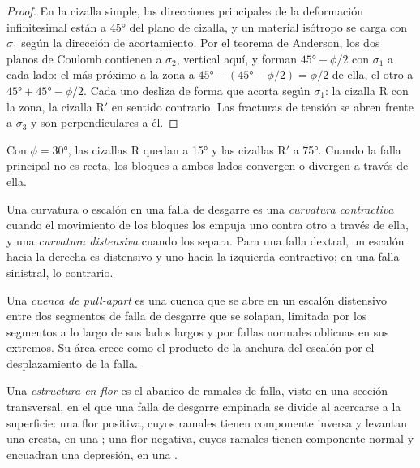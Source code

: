 \begin{proof}
En la cizalla simple, las direcciones principales de la deformación infinitesimal están a
\ang{45} del plano de cizalla, y un material isótropo se carga con
$\sigma_1$ según la dirección de acortamiento. Por el teorema de Anderson, los dos planos de Coulomb
contienen a $\sigma_2$, vertical aquí, y forman $\ang{45} - \phi/2$ con
$\sigma_1$ a cada lado: el más próximo a la zona a $\ang{45} -
(\ang{45} - \phi/2) = \phi/2$ de ella, el otro a $\ang{45} + \ang{45} -
\phi/2$. Cada uno desliza de forma que acorta según $\sigma_1$: la cizalla R con
la zona, la cizalla R$'$ en sentido contrario. Las fracturas de tensión se abren frente a $\sigma_3$ y
son perpendiculares a él.
\end{proof}

Con $\phi = \ang{30}$, las cizallas R quedan a \ang{15} y las cizallas R$'$ a
\ang{75}. Cuando la falla principal no es recta, los bloques a ambos lados
convergen o divergen a través de ella.

\begin{definition}\label{def:b3:extension-strike-slip:bends}
Una curvatura o escalón en una falla de desgarre es una \emph{curvatura
contractiva} cuando el movimiento de los bloques los empuja uno contra otro
a través de ella, y una \emph{curvatura distensiva} cuando los separa. Para una falla
dextral, un escalón hacia la derecha es distensivo y uno hacia la izquierda contractivo;
en una falla sinistral, lo contrario.
\end{definition}

\begin{definition}\label{def:b3:extension-strike-slip:pull-apart}
Una \emph{cuenca de pull-apart} es una cuenca que se abre en
un escalón distensivo entre dos segmentos de falla de desgarre que se solapan, limitada por
los segmentos a lo largo de sus lados largos y por fallas normales oblicuas en sus extremos.
Su área crece como el producto de la anchura del escalón por el desplazamiento de la falla.
\end{definition}

\begin{definition}\label{def:b3:extension-strike-slip:flower}
Una \emph{estructura en flor} es el abanico de ramales de falla,
visto en una sección transversal, en el que una falla de desgarre empinada se divide al acercarse a la
superficie: una flor positiva, cuyos ramales tienen componente inversa
y levantan una cresta, en una ; una flor negativa, cuyos ramales tienen
componente normal y encuadran una depresión, en una .
\end{definition}

